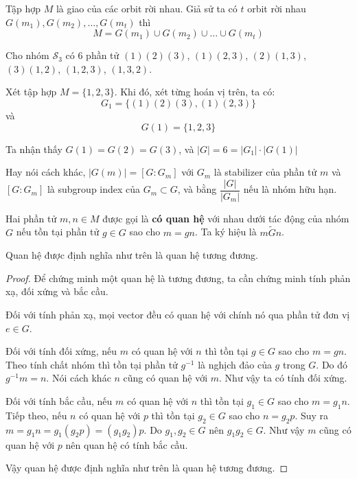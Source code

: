 \begin{corollary}
    Tập hợp $M$ là giao của các orbit rời nhau. Giả sử ta có $t$ orbit rời nhau $G(m_1), G(m_2), \ldots, G(m_t)$ thì
    \[M = G(m_1) \cup G(m_2) \cup \ldots \cup G(m_t)\]
\end{corollary}

\begin{example}
    Cho nhóm $\mathcal{S}_3$ có 6 phần tử $(1)(2)(3)$, $(1)(2,3)$, $(2)(1,3)$, $(3)(1,2)$, $(1,2,3)$, $(1,3,2)$.

    Xét tập hợp $M = \{1, 2, 3\}$. Khi đó, xét từng hoán vị trên, ta có:
    \[G_1 = \{(1)(2)(3), (1)(2,3)\}\]
    và
    \[G(1) = \{ 1, 2, 3 \}\]
\end{example}

Ta nhận thấy $G(1) = G(2) = G(3)$, và $\lvert G \rvert = 6 = \lvert G_1 \rvert \cdot \lvert G(1) \rvert$

Hay nói cách khác, $\lvert G(m) \rvert = [G: G_m]$ với $G_m$ là stabilizer của phần tử $m$ và $[G: G_m]$ là subgroup index của $G_m \subset G$, và bằng $\dfrac{\lvert G \rvert}{\lvert G_m \rvert}$ nếu là nhóm hữu hạn.

\begin{definition}
    Hai phần tử $m, n \in M$ được gọi là \textbf{có quan hệ} với nhau dưới tác động của nhóm $G$ nếu tồn tại phần tử $g \in G$ sao cho $m = g n$.
    Ta ký hiệu là $m \tilde{G} n$.
\end{definition}

\begin{remark}
    Quan hệ được định nghĩa như trên là quan hệ tương đương.
\end{remark}

\begin{proof}
    Để chứng minh một quan hệ là tương đương, ta cần chứng minh tính phản xạ, đối xứng và bắc cầu.

    Đối với tính phản xạ, mọi vector đều có quan hệ với chính nó qua phần tử đơn vị $e \in G$.

    Đối với tính đối xứng, nếu $m$ có quan hệ với $n$ thì tồn tại $g \in G$ sao cho $m = gn$. Theo tính chất nhóm thì tồn tại phần tử $g^{-1}$ là nghịch đảo của $g$ trong $G$. Do đó $g^{-1} m = n$. Nói cách khác $n$ cũng có quan hệ với $m$. Như vậy ta có tính đối xứng.

    Đối với tính bắc cầu, nếu $m$ có quan hệ với $n$ thì tồn tại $g_1 \in G$ sao cho $m = g_1 n$. Tiếp theo, nếu $n$ có quan hệ với $p$ thì tồn tại $g_2 \in G$ sao cho $n = g_2 p$. Suy ra $m = g_1 n = g_1 (g_2 p) = (g_1 g_2) p$. Do $g_1, g_2 \in G$ nên $g_1 g_2 \in G$. Như vậy $m$ cũng có quan hệ với $p$ nên quan hệ có tính bắc cầu.

    Vậy quan hệ được định nghĩa như trên là quan hệ tương đương.
\end{proof}

